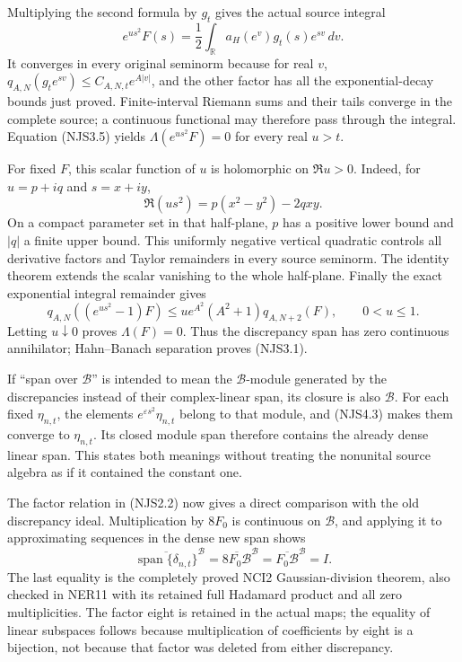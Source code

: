 Multiplying the second formula by \(g_t\) gives the actual source
integral \[
e^{us^2}F(s)=\frac12\int_{\mathbb R}a_H(e^v)g_t(s)e^{sv}\,dv.
\tag{NJS4.2}
\] It converges in every original seminorm because for real \(v\),
\(q_{A,N}(g_te^{sv})\le C_{A,N,t}e^{A|v|}\), and the other factor has
all the exponential-decay bounds just proved. Finite-interval Riemann
sums and their tails converge in the complete source; a continuous
functional may therefore pass through the integral. Equation (NJS3.5)
yields \(\Lambda(e^{us^2}F)=0\) for every real \(u>t\).

For fixed \(F\), this scalar function of \(u\) is holomorphic on
\(\Re u>0\). Indeed, for \(u=p+iq\) and \(s=x+iy\), \[
\Re(us^2)=p(x^2-y^2)-2qxy.
\] On a compact parameter set in that half-plane, \(p\) has a positive
lower bound and \(|q|\) a finite upper bound. This uniformly negative
vertical quadratic controls all derivative factors and Taylor remainders
in every source seminorm. The identity theorem extends the scalar
vanishing to the whole half-plane. Finally the exact exponential
integral remainder gives \[
q_{A,N}((e^{us^2}-1)F)
\le ue^{A^2}(A^2+1)q_{A,N+2}(F),\qquad0<u\le1.
\tag{NJS4.3}
\] Letting \(u\downarrow0\) proves \(\Lambda(F)=0\). Thus the
discrepancy span has zero continuous annihilator; Hahn--Banach
separation proves (NJS3.1).

If ``span over \(\mathcal B\)'' is intended to mean the
\(\mathcal B\)-module generated by the discrepancies instead of their
complex-linear span, its closure is also \(\mathcal B\). For each fixed
\(\eta_{n,t}\), the elements \(e^{\varepsilon s^2}\eta_{n,t}\) belong to
that module, and (NJS4.3) makes them converge to \(\eta_{n,t}\). Its
closed module span therefore contains the already dense linear span.
This states both meanings without treating the nonunital source algebra
as if it contained the constant one.

The factor relation in (NJS2.2) now gives a direct comparison with the
old discrepancy ideal. Multiplication by \(8F_0\) is continuous on
\(\mathcal B\), and applying it to approximating sequences in the dense
new span shows \[
\overline{\operatorname{span}\{\delta_{n,t}\}}^{\mathcal B}
=\overline{8F_0\mathcal B}^{\mathcal B}
=\overline{F_0\mathcal B}^{\mathcal B}=I.
\tag{NJS4.4}
\] The last equality is the completely proved NCI2 Gaussian-division
theorem, also checked in NER11 with its retained full Hadamard product
and all zero multiplicities. The factor eight is retained in the actual
maps; the equality of linear subspaces follows because multiplication of
coefficients by eight is a bijection, not because that factor was
deleted from either discrepancy.

